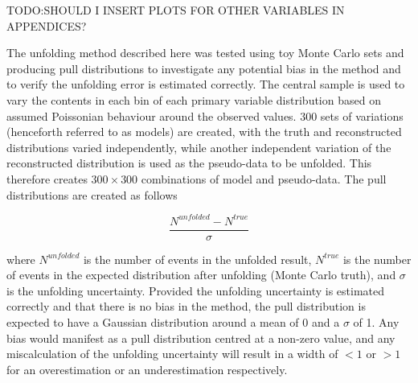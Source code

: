 TODO:SHOULD I INSERT PLOTS FOR OTHER VARIABLES IN APPENDICES?

The unfolding method described here was tested using toy Monte Carlo sets and producing pull distributions to
investigate any potential bias in the method and to verify the unfolding error is estimated correctly. The
central \ttbar \MADGRAPH sample is used to vary the contents in each bin of each primary variable distribution
based on assumed Poissonian behaviour around the observed values. 300 sets of variations (henceforth referred
to as models) are created, with the truth and reconstructed distributions varied independently, while another
independent variation of the reconstructed distribution is used as the pseudo-data to be unfolded. This
therefore creates $300\times300$ combinations of model and pseudo-data. The pull distributions are created as
follows

\begin{equation}
\frac{N^{unfolded}-N^{true}}{\sigma}
\label{eq:pulls}
\end{equation}

where $N^{unfolded}$ is the number of events in the unfolded result, $N^{true}$ is the number of events in the
expected distribution after unfolding (Monte Carlo truth), and $\sigma$ is the unfolding uncertainty. Provided
the unfolding uncertainty is estimated correctly and that there is no bias in the method, the pull
distribution is expected to have a Gaussian distribution around a mean of 0 and a $\sigma$ of 1. Any bias
would manifest as a pull distribution centred at a non-zero value, and any miscalculation of the
unfolding uncertainty will result in a width of $<1$ or $>1$ for an overestimation or an underestimation
respectively.

